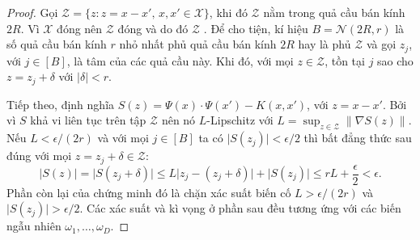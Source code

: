 \begin{proof}
  Gọi $\mathcal{Z} = \{z\colon z = x - x',\, x, x' \in \mathcal{X} \}$, khi đó
  $\mathcal{Z}$ nằm trong quả cầu bán kính $2R$. Vì $\mathcal{X}$ đóng nên
  $\mathcal{Z}$ đóng và do đó $\mathcal{Z}$ . Để cho tiện, kí hiệu
  $B = \mathcal{N}(2R, r)$ là số quả cầu bán kính $r$ nhỏ nhất phủ quả cầu bán
  kính $2R$ hay là phủ $\mathcal{Z}$ và gọi $z_j$, với $j \in [B]$, là tâm của
  các quả cầu này. Khi đó, với mọi $z\in \mathcal{Z}$, tồn tại $j$ sao cho $z =
  z_j + \delta$ với $\lvert \delta \rvert < r$.

  Tiếp theo, định nghĩa $S(z) = \Psi(x) \cdot \Psi(x') - K(x, x')$, với $z = x
  - x'$. Bởi vì $S$ khả vi liên tục trên tập  $\mathcal{Z}$ nên nó
  $L$-Lipschitz với $L = \sup_{z \in \mathcal{Z}} \bigl\lVert \nabla S(z)
  \bigr\rVert$.  Nếu $L < \epsilon / (2r)$ và với mọi $j \in [B]$ ta có
  $\bigl\lvert S(z_j) \bigr\rvert < \epsilon / 2$ thì bất đẳng thức sau đúng
  với mọi $z = z_j + \delta \in \mathcal{Z}$: \begin{equation}
    \label{eq:bound-easy-case}
    \bigl\lvert S(z) \bigr\rvert = \bigl\lvert S(z_j + \delta) \bigr\rvert \le
    L \lvert z_j - (z_j + \delta) \rvert + \bigl\lvert S(z_j) \bigr\rvert \le
    rL + \frac{\epsilon}{2} < \epsilon.
  \end{equation} Phần còn lại của chứng minh đó là chặn xác suất biến cố $L >
  \epsilon / (2r)$ và $\bigl\lvert S(z_j) \bigr\rvert > \epsilon / 2$.  Các xác
  suất và kì vọng ở phần sau đều tương ứng với các biến ngẫu nhiên
  $\omega_1, \dots, \omega_D$.


\end{proof}
